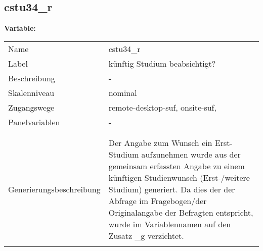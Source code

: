 	
	
	\subsection{cstu34\_r}
	\label{subSection:cstu34_r}

	\noindent\textbf{Variable:}\\
		\begin{tabular}{lL{11.3cm}}
			\label{tableVariable:cstu34_r}
			Name & cstu34\_r \\
			Label & künftig Studium beabsichtigt? \\
			Beschreibung & - \\
			Skalenniveau & nominal \\
			Zugangswege &
				remote-desktop-suf,
				onsite-suf,
 \\
			Panelvariablen & -
			 \\
			 \\
 \\
					Generierungsbeschreibung & Der Angabe zum Wunsch ein Erst-Studium aufzunehmen wurde aus der gemeinsam erfassten Angabe zu einem künftigen Studienwunsch (Erst-/weitere Studium) generiert. Da dies der der Abfrage im Fragebogen/der Originalangabe der Befragten entspricht, wurde im Variablennamen auf den Zusatz \_g verzichtet.
				 \\	
			 \\
		\end{tabular}






